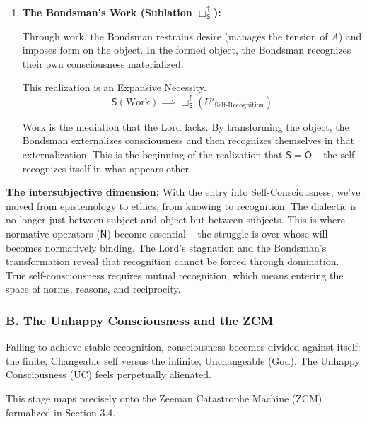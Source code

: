 \documentclass[12pt]{book}
\newcommand{\SBoxUp}{\Box_{\mathsf{S}}^{\uparrow}}
\begin{document}
\begin{itemize}
\begin{enumerate}
The fear of death is the moment when all determinate content dissolves. The Bondsman experiences their own nothingness, which paradoxically becomes the condition for transformation.

\item \textbf{The Bondsman's Work (Sublation $\SBoxUp$):}

Through work, the Bondsman restrains desire (manages the tension of $A$) and imposes form on the object. In the formed object, the Bondsman recognizes their own consciousness materialized.

This realization is an Expansive Necessity.
\[
\mathsf{S}(\text{Work}) \implies \SBoxUp(U'_{\text{Self-Recognition}})
\]

Work is the mediation that the Lord lacks. By transforming the object, the Bondsman externalizes consciousness and then recognizes themselves in that externalization. This is the beginning of the realization that $\mathsf{S} = \mathsf{O}$ -- the self recognizes itself in what appears other.
\end{enumerate}
\end{itemize}

\textbf{The intersubjective dimension:} With the entry into Self-Consciousness, we've moved from epistemology to ethics, from knowing to recognition. The dialectic is no longer just between subject and object but between subjects. This is where normative operators ($\mathsf{N}$) become essential -- the struggle is over whose will becomes normatively binding. The Lord's stagnation and the Bondsman's transformation reveal that recognition cannot be forced through domination. True self-consciousness requires mutual recognition, which means entering the space of norms, reasons, and reciprocity.

\subsubsection{B. The Unhappy Consciousness and the ZCM}

Failing to achieve stable recognition, consciousness becomes divided against itself: the finite, Changeable self versus the infinite, Unchangeable (God). The Unhappy Consciousness (UC) feels perpetually alienated.

This stage maps precisely onto the Zeeman Catastrophe Machine (ZCM) formalized in Section 3.4.
\end{document}
